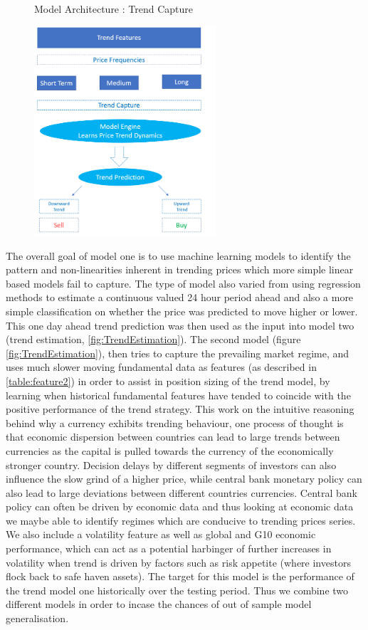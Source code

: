 \documentclass[11pt]{article}
\begin{document}
\begin{figure}[h]
    \centering
	\caption{Model Architecture : Trend Capture}    
	\includegraphics[width=0.6\textwidth]{TrendCapture}
    \label{fig:TrendCapture}
     \caption*{}
\end{figure}
 The overall goal of model one is to use machine learning models to identify the pattern and non-linearities inherent in trending prices which more simple linear based models fail to capture.  The type of model also varied from using regression methods to estimate a continuous valued 24 hour period ahead and also a more simple classification on whether the price was predicted to move higher or lower. This one day ahead trend prediction was then used as the input into model two (trend estimation, \ref{fig:TrendEstimation}).
\clearpage
The second model (figure \ref{fig:TrendEstimation}), then tries to capture the prevailing market regime, and uses much slower moving fundamental data as features (as described in \ref{table:feature2}) in order to assist in position sizing of the trend model, by learning when historical fundamental features have tended to coincide with the positive performance of the trend strategy. This work on the intuitive reasoning behind why a currency exhibits trending behaviour, one process of thought is that economic dispersion between countries \cite{fxalpha} can lead to large trends between currencies as the capital is pulled towards the currency of the economically stronger country. Decision delays by different segments of investors can also influence the slow grind of a higher price, while central bank monetary policy can also lead to large deviations between different countries currencies. Central bank policy can often be driven by economic data and thus looking at economic data we maybe able to identify regimes which are conducive to trending prices series. We also include a volatility feature as well as global and G10 economic performance, which can act as a potential harbinger of further increases in volatility when trend is driven by factors such as risk appetite (where investors flock back to safe haven assets). The target for this model is the performance of the trend model one historically over the testing period. Thus we combine two different models in order to incase the chances of out of sample model generalisation.
 
\end{document}
